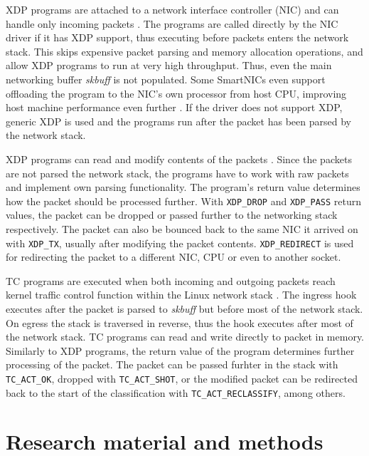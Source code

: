 \documentclass[english, 12pt, a4paper, sci, utf8, a-2b, online]{aaltothesis}
\begin{document}
XDP programs are attached to a network interface controller (NIC) and can handle only incoming packets \cite{hoiland2018express}. The programs are called directly by the NIC driver if it has XDP support, thus executing before packets enters the network stack. This skips expensive packet parsing and memory allocation operations, and allow XDP programs to run at very high throughput. Thus, even the main networking buffer \textit{skbuff} is not populated. Some SmartNICs even support offloading the program to the NIC's own processor from host CPU, improving host machine performance even further \cite{cilium-program-types}. If the driver does not support XDP, generic XDP is used and the programs run after the packet has been parsed by the network stack.

XDP programs can read and modify contents of the packets \cite{vieira2020fast}. Since the packets are not parsed the network stack, the programs have to work with raw packets and implement own parsing functionality. The program's return value determines how the packet should be processed further. With \texttt{XDP\_DROP} and \texttt{XDP\_PASS} return values, the packet can be dropped or passed further to the networking stack respectively. The packet can also be bounced back to the same NIC it arrived on with \texttt{XDP\_TX}, usually after modifying the packet contents. \texttt{XDP\_REDIRECT} is used for redirecting the packet to a different NIC, CPU or even to another socket.

TC programs are executed when both incoming and outgoing packets reach kernel traffic control function within the Linux network stack \cite{vieira2020fast}. The ingress hook executes after the packet is parsed to \textit{skbuff} but before most of the network stack. On egress the stack is traversed in reverse, thus the hook executes after most of the network stack. TC programs can read and write directly to packet in memory. Similarly to XDP programs, the return value of the program determines further processing of the packet. The packet can be passed furhter in the stack with \texttt{TC\_ACT\_OK}, dropped with \texttt{TC\_ACT\_SHOT}, or the modified packet can be redirected back to the start of the classification with \texttt{TC\_ACT\_RECLASSIFY}, among others.

\clearpage

\section{Research material and methods} \label{sec:methods}
\end{document}
